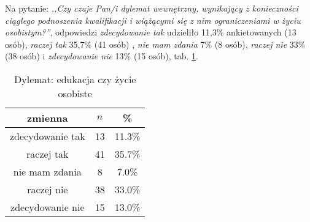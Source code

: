 Na pytanie: \textit{,,Czy czuje Pan/i dylemat wewnętrzny, wynikający z konieczności ciągłego podnoszenia kwalifikacji i wiążącymi się z nim ograniczeniami w życiu osobistym?''}, odpowiedzi \textit{zdecydowanie tak} udzieliło 11,3\% ankietowanych (13 osób), \textit{raczej tak} 35,7\% (41 osób) , \textit{nie mam zdania} 7\% (8 osób), \textit{raczej nie} 33\% (38 osób) i \textit{zdecydowanie nie} 13\% (15 osób), tab. \ref{tab:Q14}.


\begin{table}[H]
\caption{Dylemat: edukacja czy życie osobiste}
\centering
\begin{tabular}{ | c | c | c |}
\hline
zmienna & $n$ & \% \\
\hline
zdecydowanie tak  &  13  & 11.3\% \\
\hline
raczej tak  &  41  & 35.7\% \\
\hline
nie mam zdania  &  8  & 7.0\% \\
\hline
raczej nie  &  38  & 33.0\% \\
\hline
zdecydowanie nie  &  15  & 13.0\% \\
\hline
\end{tabular}
\label{tab:Q14}
\end{table}
